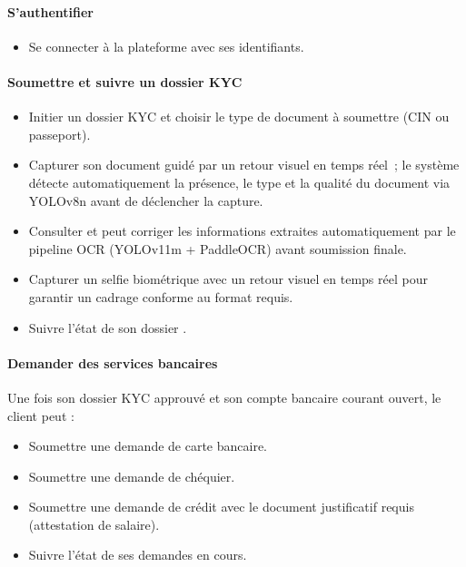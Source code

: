 \paragraph*{S'authentifier}
\begin{itemize} 
  \item Se connecter à la plateforme avec ses identifiants. 
\end{itemize}

\paragraph*{Soumettre et suivre un dossier KYC}
\begin{itemize}
  \item Initier un dossier KYC et choisir le type de document à soumettre (CIN ou passeport).
  \item Capturer son document guidé par un retour visuel en temps réel~; le système détecte automatiquement la présence, le type et la qualité du document via YOLOv8n avant de déclencher la capture.
  \item Consulter et peut corriger les informations extraites automatiquement par le pipeline OCR (YOLOv11m + PaddleOCR) avant soumission finale.
  \item Capturer un selfie biométrique avec un retour visuel en temps réel pour garantir un cadrage conforme au format requis.
  \item Suivre l'état de son dossier .
\end{itemize}

\paragraph*{Demander des services bancaires}

\noindent Une fois son dossier KYC approuvé et son compte bancaire courant ouvert, le client peut :

\begin{itemize}
  \item Soumettre une demande de carte bancaire.
  \item Soumettre une demande de chéquier.
  \item Soumettre une demande de crédit avec le document justificatif requis (attestation de salaire).
  \item Suivre l'état de ses demandes en cours.
\end{itemize}

